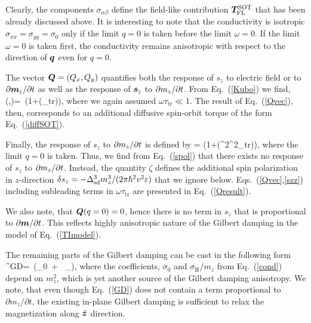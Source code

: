 Clearly, the components $\sigma_{\alpha\beta}$ define the field-like contribution $\boldsymbol{T}^\textrm{SOT}_\textrm{FL}$ that has been already discussed above. It is interesting to note that the conductivity is isotropic $\sigma_{xx}=\sigma_{yy}=\sigma_0$ only if the limit $q= 0$ is taken before the limit $\omega=0$. If the limit $\omega=0$ is taken first, the conductivity remains anisotropic with respect to the direction of $\boldsymbol{q}$ even for $q=0$.

The vector $\boldsymbol{Q}=(Q_x,Q_y)$ quantifies both the response of $s_z$ to electric field or to $\partial \boldsymbol{m}_{\scriptscriptstyle\parallel}/\partial t$ as well as the response of $\boldsymbol{s}_{\scriptscriptstyle\parallel}$ to  $\partial m_z/\partial t$. From Eq.~(\ref{Kubo}) we find,
\be
\label{Qvec}
(\omega,)=\, \lt(1+(\omega\tau_\textrm{tr})\rt),
\e
where we again assumed $\omega\tau_\textrm{tr} \ll 1$. The result of Eq.~(\ref{Qvec}), then, corresponds to an additional diffusive spin-orbit torque of the form Eq.~(\ref{diffSOT}).

Finally, the response of $s_z$ to $\partial m_z/\partial t$ is defined by 
\be
\label{szz}
\zeta = \lt(1+(\omega^2\tau^2_\textrm{tr})\rt),
\e
where the limit $q=0$ is taken. Thus, we find from Eq.~(\ref{spol}) that there exists no response of $s_z$ to $\partial m_z/\partial t$. Instead, the quantity $\zeta$ defines the additional spin polarization in $z$-direction $\delta s_z = - \Delta_\textrm{sd}^3m_z^3/(2\pi \hslash^2 v^2\varepsilon)$ that we ignore below. Eqs.~(\ref{Qvec},\ref{szz}) including subleading terms in $\omega\tau_\mathrm{tr}$ are presented in Eq.~(\ref{Qresult}).

We also note, that $\boldsymbol{Q}(q=0)=0$, hence there is no term in $s_z$ that is proportional to $\partial\boldsymbol{m}/\partial t$. This reflects highly anisotropic nature of the Gilbert damping in the model of Eq.~(\ref{TImodel}).

The remaining parts of the Gilbert damping can be cast in the following form 
\be
{}^\textrm{GD}=\,\times
\Big(\sigma_0\, + \, \times{}_\perp \Big),
\label{GD}
\e
where the coefficients, $\sigma_0$ and $\sigma_\textrm{H}/m_z$ from Eq.~(\ref{cond}) depend on $m_z^2$, which is yet another source of the Gilbert damping anisotropy.  We note, that even though Eq.~(\ref{GD}) does not contain a term proportional to $\partial m_z/\partial t$, the existing in-plane Gilbert damping is sufficient to relax the magnetization along $\hat{\boldsymbol{z}}$ direction. 

